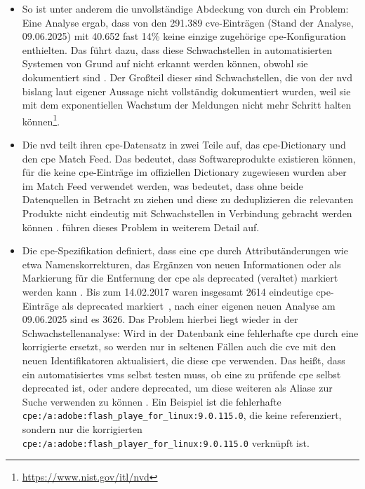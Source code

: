 \begin{itemize}
    \item So ist unter anderem die unvollständige Abdeckung von  durch  ein Problem:
    Eine Analyse ergab, dass von den 291.389 \acrshort{cve}-Einträgen (Stand der Analyse, 09.06.2025) mit 40.652 fast 14\% keine einzige zugehörige \acrshort{cpe}-Konfiguration enthielten.
    Das führt dazu, dass diese Schwachstellen in automatisierten Systemen von Grund auf nicht erkannt werden können, obwohl sie dokumentiert sind \autocite{Sanguino_Uetz_2017}.
    Der Großteil dieser  sind Schwachstellen, die von der \acrshort{nvd} bislang laut eigener Aussage nicht vollständig dokumentiert wurden, weil sie mit dem exponentiellen Wachstum der Meldungen nicht mehr Schritt halten können\footnote{\url{https://www.nist.gov/itl/nvd}}.

    \item Die \acrshort{nvd} teilt ihren \acrshort{cpe}-Datensatz in zwei Teile auf, das \acrshort{cpe}-Dictionary \autocite{Cichonski_Waltermire_Scarfone_2011} und den \acrshort{cpe} Match Feed.
    Das bedeutet, dass Softwareprodukte existieren können, für die keine \acrshort{cpe}-Einträge im offiziellen Dictionary zugewiesen wurden aber im Match Feed verwendet werden, was bedeutet, dass ohne beide Datenquellen in Betracht zu ziehen und diese zu deduplizieren die relevanten Produkte nicht eindeutig mit Schwachstellen in Verbindung gebracht werden können \autocite{Sanguino_Uetz_2017}.
    \textcite{Sanguino_Uetz_2017} führen dieses Problem in weiterem Detail auf.

    \item Die \acrshort{cpe}-Spezifikation definiert, dass eine \acrshort{cpe} durch Attributänderungen wie etwa Namenskorrekturen, das Ergänzen von neuen Informationen oder als Markierung für die Entfernung der \acrshort{cpe} als deprecated (veraltet) markiert werden kann \autocite{Cichonski_Waltermire_Scarfone_2011}.
    Bis zum 14.02.2017 waren insgesamt 2614 eindeutige \acrshort{cpe}-Einträge als deprecated markiert\ \autocite{Sanguino_Uetz_2017}, nach einer eigenen neuen Analyse am 09.06.2025 sind es 3626.
    Das Problem hierbei liegt wieder in der Schwachstellenanalyse:
    Wird in der Datenbank eine fehlerhafte \acrshort{cpe} durch eine korrigierte ersetzt, so werden nur in seltenen Fällen auch die \acrshort{cve} mit den neuen Identifikatoren aktualisiert, die diese \acrshort{cpe} verwenden.
    Das heißt, dass ein automatisiertes \acrshort{vms} selbst testen muss, ob eine zu prüfende \acrshort{cpe} selbst deprecated ist, oder andere deprecated, um diese weiteren  als Aliase zur Suche verwenden zu können \autocite{Sanguino_Uetz_2017}.
    Ein Beispiel ist die fehlerhafte \texttt{cpe:/a:adobe:flash\_playe\_for\_linux:9.0.115.0}, die keine  referenziert, sondern nur die korrigierten \texttt{cpe:/a:adobe:flash\_playe\textit{r}\_for\_linux:9.0.115.0} verknüpft ist.


\end{itemize}
